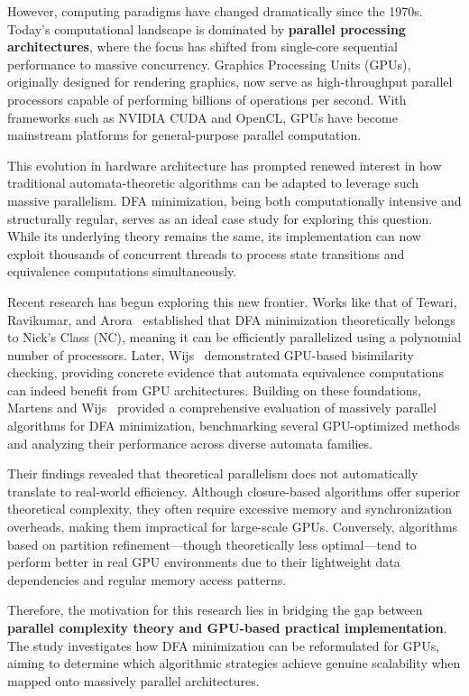 However, computing paradigms have changed dramatically since the 1970s. Today’s computational landscape is dominated by \textbf{parallel processing architectures}, where the focus has shifted from single-core sequential performance to massive concurrency. Graphics Processing Units (GPUs), originally designed for rendering graphics, now serve as high-throughput parallel processors capable of performing billions of operations per second. With frameworks such as NVIDIA CUDA and OpenCL, GPUs have become mainstream platforms for general-purpose parallel computation.

This evolution in hardware architecture has prompted renewed interest in how traditional automata-theoretic algorithms can be adapted to leverage such massive parallelism. DFA minimization, being both computationally intensive and structurally regular, serves as an ideal case study for exploring this question. While its underlying theory remains the same, its implementation can now exploit thousands of concurrent threads to process state transitions and equivalence computations simultaneously.

Recent research has begun exploring this new frontier. Works like that of Tewari, Ravikumar, and Arora~\cite{tewari2002} established that DFA minimization theoretically belongs to Nick’s Class (NC), meaning it can be efficiently parallelized using a polynomial number of processors. Later, Wijs~\cite{wijs2015} demonstrated GPU-based bisimilarity checking, providing concrete evidence that automata equivalence computations can indeed benefit from GPU architectures. Building on these foundations, Martens and Wijs~\cite{martenswijs2024} provided a comprehensive evaluation of massively parallel algorithms for DFA minimization, benchmarking several GPU-optimized methods and analyzing their performance across diverse automata families.

Their findings revealed that theoretical parallelism does not automatically translate to real-world efficiency. Although closure-based algorithms offer superior theoretical complexity, they often require excessive memory and synchronization overheads, making them impractical for large-scale GPUs. Conversely, algorithms based on partition refinement—though theoretically less optimal—tend to perform better in real GPU environments due to their lightweight data dependencies and regular memory access patterns.

Therefore, the motivation for this research lies in bridging the gap between \textbf{parallel complexity theory and GPU-based practical implementation}. The study investigates how DFA minimization can be reformulated for GPUs, aiming to determine which algorithmic strategies achieve genuine scalability when mapped onto massively parallel architectures.

